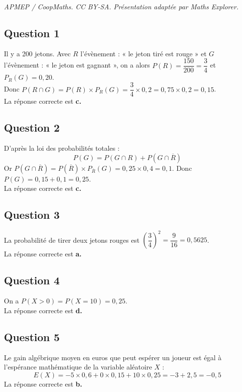 \documentclass[10pt]{article}
\begin{document}
\noindent\textit{APMEP / CoopMaths. CC BY-SA. Présentation adaptée par Maths Explorer.}\par\medskip
\subsection*{Question 1}
Il y a 200 jetons. Avec $R$ l'évènement : « le jeton tiré est rouge » et $G$ l'évènement : « le jeton est gagnant », on a alors $P(R) = \dfrac{150}{200} = \dfrac{3}{4}$ et $P_R(G) = 0,20$.\\
Donc $P(R \cap G) = P(R) \times P_R(G) = \dfrac{3}{4} \times 0,2 = 0,75 \times 0,2 = 0,15$.\\ La réponse correcte est \textbf{c.}
	
	\subsection*{Question 2}
	
D'après la loi des probabilités totales :
	\[
	P(G) = P(G \cap R) + P(G \cap \overline{R})
	\]
Or $P(G \cap \overline{R}) = P(\overline{R}) \times P_{\overline{R}}(G) = 0,25 \times 0,4 = 0,1$. Donc $P(G) = 0,15 + 0,1 = 0,25$.\\ La réponse correcte est \textbf{c.}
	
	\subsection*{Question 3}
La probabilité de tirer deux jetons rouges est $\left(\dfrac{3}{4}\right)^2 = \dfrac{9}{16} = 0,5625$.\\ La réponse correcte est \textbf{a.}
	

\subsection*{Question 4}
	
On a $P(X > 0) = P(X = 10) = 0,25$.\\ La réponse correcte est \textbf{d.}
	
	\subsection*{Question 5}

Le gain algébrique moyen en euros que peut espérer un joueur est égal à l'espérance mathématique de la variable aléatoire $X$ :
	\[
	E(X) = -5 \times 0,6 + 0 \times 0,15 + 10 \times 0,25 = -3 + 2,5 = -0,5
	\]
La réponse correcte est \textbf{b.}
\end{document}
